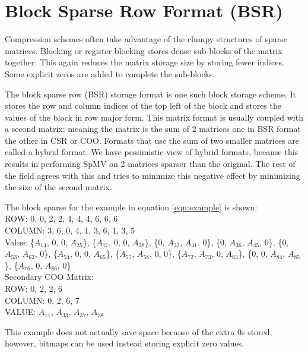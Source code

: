 \section{Block Sparse Row Format (BSR)}
\par Compression schemes often take advantage of the clumpy structures of sparse matrices. Blocking or register blocking stores dense sub-blocks of the matrix together. This again reduces the matrix storage size by storing fewer indices. Some explicit zeros are added to complete the sub-blocks.
\par The block sparse row (BSR) storage format is one such block storage scheme. It stores the row and column indices of the top left of the block and stores the values of the block in row major form. This matrix format is usually coupled with a second matrix; meaning the matrix is the sum of 2 matrices one in BSR format the other in CSR or COO. Formats that use the sum of two smaller matrices are called a hybrid format. We have pessimistic view of hybrid formats, because this results in performing SpMV on 2 matrices sparser than the original. The rest of the field agrees with this and tries to minimize this negative effect by minimizing the size of the second matrix. \par
The block sparse for the example in equation \ref{eqn:example} is shown:\\
ROW: 0, 0, 2, 2, 4, 4, 4, 6, 6, 6\\
COLUMN: 3, 6, 0, 4, 1, 3, 6, 1, 3, 5 \\
Value: \{$A_{14}$, $0$, $0$, $A_{25}$\}, \{$A_{17}$, $0$, $0$, $A_{28}$\}, \{$0$, $A_{32}$, $A_{41}$, $0$\}, \{$0$, $A_{36}$, $A_{45}$, $0$\}, \{$0$, $A_{53}$, $A_{62}$, $0$\}, \{$A_{54}$, $0$, $0$, $A_{65}$\}, \{$A_{57}$, $A_{58}$, $0$, $0$\}, \{$A_{72}$, $A_{73}$, $0$, $A_{83}$\}, \{$0$, $0$, $A_{84}$, $A_{85}$\}, \{$A_{76}$, $0$, $A_{86}$, $0$\}\\
Secondary COO Matrix:\\
ROW: 0, 2, 2, 6\\
COLUMN: 0, 2, 6, 7\\
VALUE: $A_{11}$, $A_{33}$, $A_{37}$, $A_{78}$\par
This example does not actually save space because of the extra 0s stored, however, bitmaps can be used instead storing explicit zero values.
